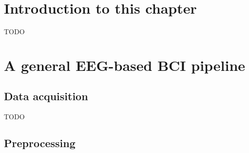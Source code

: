 \section{Introduction to this chapter}
\label{sec:processing_signals_introduction}

TODO



\section{A general EEG-based BCI pipeline}
\label{sec:processing_signals_general_pipeline}




\subsection{Data acquisition}
\label{subsec:processing_signals_general_pipeline_data_acquisition}


TODO


\subsection{Preprocessing}
\label{subsec:processing_signals_general_pipeline_preprocessing}



